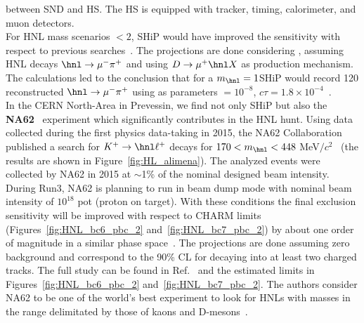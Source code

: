 between SND and HS. The HS is equipped with 
tracker, timing, calorimeter, and muon detectors. \\
For HNL mass scenarios $<2$\GeV, SHiP would have improved the sensitivity
with respect to previous searches~\cite{bonivento2013proposal}.
The projections are done considering \mixparm, assuming HNL decays $\hnl
\rightarrow \mu ^{-} \pi^{+}$ and using $D
\rightarrow \mu ^{+} \hnl X$ as production mechanism. The calculations
led to the conclusion that for a $m_\hnl = 1$\GeV SHiP would record
120 reconstructed $\hnl
\rightarrow \mu ^{-} \pi^{+}$ using as parameters \mixparm $= 10^{-8}$,
$c\tau = 1.8 \times 10^{-4}$~\cite{bonivento2013proposal}. \\

In the CERN North-Area in Prevessin, we find not only SHiP but also the
\textbf{NA62}~\cite{Gil_2017} experiment which significantly contributes in
the HNL hunt. Using data 
collected during the first physics data-taking in 2015, the NA62
Collaboration published a search for $K^{+} \rightarrow \hnl \ell^{+}$
decays for $170 <m_\hnl< 448$ MeV$/c^{2}$~\cite{Cortina_Gil_2018} (the
results are shown in Figure~\ref{fig:HL_alimena}). The analyzed events
were collected by NA62 in 2015 at $\sim$1\% of the nominal designed
beam intensity.\\
During Run3, NA62 is planning to run in beam dump mode with
nominal beam intensity of $10^{18}$ pot (proton on target). With these
conditions the final exclusion sensitivity will be improved with 
respect to CHARM limits (Figures~\ref{fig:HNL_bc6_pbc_2}
and~\ref{fig:HNL_bc7_pbc_2})
by about one order of magnitude in a similar phase
space~\cite{na62Drewes_2018}.
The projections are done assuming zero background and 
correspond to the 90\% CL for \hnl decaying into at least two
 charged tracks. The full study can be found in
 Ref.~\cite{na62Drewes_2018} and the estimated limits in Figures~\ref{fig:HNL_bc6_pbc_2}
and~\ref{fig:HNL_bc7_pbc_2}. The authors consider NA62 to be one of
the world’s best experiment to look for HNLs with masses in the range
delimitated by those of kaons and D-mesons~\cite{na62Drewes_2018}.\\
